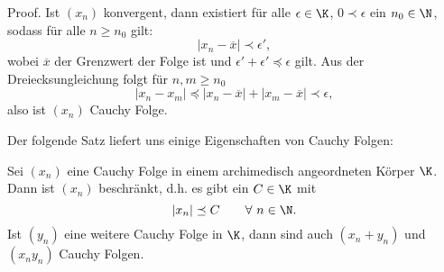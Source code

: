 \documentclass[letterpaper,10pt,english]{jupyterBook}
\begin{document}
\begin{emphBox}{}{}
Proof. Ist \((x_n)\) konvergent, dann existiert für alle \(\epsilon \in \K\), \(0 \prec \epsilon\) ein \(n_0 \in \N\), sodass für alle \(n \geq n_0\) gilt:
\begin{equation*}
| x_n - \overline{x} | \prec  \epsilon',
\end{equation*}
wobei \(\overline{x}\) der Grenzwert der Folge ist und \(\epsilon'+\epsilon' \preceq \epsilon\) gilt. Aus der Dreiecksungleichung folgt für \(n,m \geq n_0\)
\begin{equation*}
| x_n - x_m | \preceq  | x_n - \overline{x} |  +  | x_m - \overline{x} | \prec \epsilon,
\end{equation*}
also ist \((x_n)\) Cauchy Folge.
\end{emphBox}

Der folgende Satz liefert uns einige Eigenschaften von Cauchy Folgen:
\label{grundlagen/zahlensysteme:theorem-16}
\begin{theorem}{}{}



Sei \((x_n)\) eine Cauchy Folge in einem archimedisch angeordneten Körper \(\K\). Dann ist \((x_n)\) beschränkt, d.h. es gibt ein \(C \in \K\) mit
\begin{equation*}
|x_n| \preceq C \qquad \forall~n \in \N.
\end{equation*}
Ist \((y_n)\) eine weitere Cauchy Folge in \(\K\), dann sind auch \((x_n+y_n)\) und \((x_n y_n)\) Cauchy Folgen.
\end{theorem}
\end{document}
